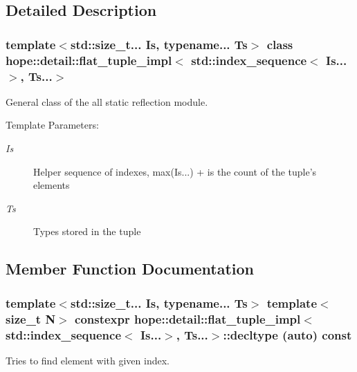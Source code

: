 \subsection{Detailed Description}
\subsubsection*{template$<$std::size\_\-t... Is, typename... Ts$>$ class hope::detail::flat\_\-tuple\_\-impl$<$ std::index\_\-sequence$<$ Is...$>$, Ts...$>$}

General class of the all static reflection module. \begin{Desc}
\item[Template Parameters:]
\begin{description}
\item[{\em Is}]Helper sequence of indexes, max(Is...) + is the count of the tuple's elements \item[{\em Ts}]Types stored in the tuple \end{description}
\end{Desc}


\subsection{Member Function Documentation}
\hypertarget{classhope_1_1detail_1_1flat__tuple__impl_3_01std_1_1index__sequence_3_01_is_8_8_8_4_00_01_ts_8_8_8_4_0db8adfa32e775efc297ffd41fdda6a7}{
\subsubsection[{decltype}]{\setlength{\rightskip}{0pt plus 5cm}template$<$std::size\_\-t... Is, typename... Ts$>$ template$<$size\_\-t N$>$ constexpr hope::detail::flat\_\-tuple\_\-impl$<$ std::index\_\-sequence$<$ Is...$>$, Ts...$>$::decltype (auto) const}}
\label{classhope_1_1detail_1_1flat__tuple__impl_3_01std_1_1index__sequence_3_01_is_8_8_8_4_00_01_ts_8_8_8_4_0db8adfa32e775efc297ffd41fdda6a7}


Tries to find element with given index. 

